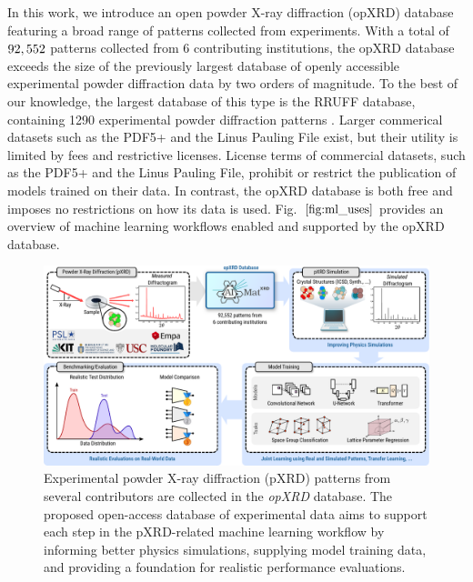 In this work, we introduce an open powder X-ray diffraction (opXRD) database featuring a broad range of patterns collected from experiments. With a total of $92,552$ patterns collected from 6 contributing institutions, the opXRD database exceeds the size of the previously largest database of openly accessible experimental powder diffraction data by two orders of magnitude. To the best of our knowledge, the largest database of this type is the RRUFF database, containing 1290 experimental powder diffraction patterns \cite{lafuente2015}. Larger commerical datasets such as the PDF5+\cite{GatesRector2019} and the Linus Pauling File\cite{villars2018} exist, but their utility is limited by fees and restrictive licenses. License terms of commercial datasets, such as the PDF5+ and the Linus Pauling File, prohibit or restrict the publication of models trained on their data. In contrast, the opXRD database is both free and imposes no restrictions on how its data is used. Fig.~$\eqref{fig:ml_uses}$ provides an overview of machine learning workflows enabled and supported by the opXRD database.

\begin{figure}[!htb]
    \centering
    \includegraphics[width=1.0\linewidth]{figures/pipeline.pdf}
    \caption{Experimental powder X-ray diffraction (pXRD) patterns from several contributors are collected in the \textit{opXRD} database. The proposed open-access database of experimental data aims to support each step in the pXRD-related machine learning workflow by informing better physics simulations, supplying model training data, and providing a foundation for realistic performance evaluations.}
    \label{fig:ml_uses}
\end{figure}


